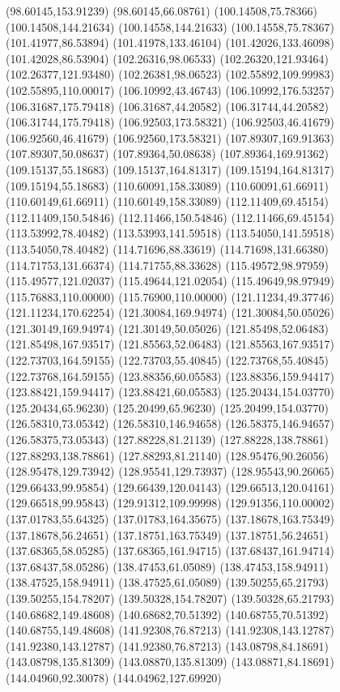 {(98.60145,153.91239) (98.60145,66.08761) (100.14508,75.78366) (100.14508,144.21634) (100.14558,144.21633) (100.14558,75.78367) (101.41977,86.53894) (101.41978,133.46104)
(101.42026,133.46098) (101.42028,86.53904) (102.26316,98.06533) (102.26320,121.93464) (102.26377,121.93480) (102.26381,98.06523) (102.55892,109.99983) (102.55895,110.00017)
(106.10992,43.46743) (106.10992,176.53257) (106.31687,175.79418) (106.31687,44.20582) (106.31744,44.20582) (106.31744,175.79418) (106.92503,173.58321) (106.92503,46.41679)
(106.92560,46.41679) (106.92560,173.58321) (107.89307,169.91363) (107.89307,50.08637) (107.89364,50.08638) (107.89364,169.91362) (109.15137,55.18683) (109.15137,164.81317)
(109.15194,164.81317) (109.15194,55.18683) (110.60091,158.33089) (110.60091,61.66911) (110.60149,61.66911) (110.60149,158.33089) (112.11409,69.45154) (112.11409,150.54846)
(112.11466,150.54846) (112.11466,69.45154) (113.53992,78.40482) (113.53993,141.59518) (113.54050,141.59518) (113.54050,78.40482) (114.71696,88.33619) (114.71698,131.66380)
(114.71753,131.66374) (114.71755,88.33628) (115.49572,98.97959) (115.49577,121.02037) (115.49644,121.02054) (115.49649,98.97949) (115.76883,110.00000) (115.76900,110.00000)
(121.11234,49.37746) (121.11234,170.62254) (121.30084,169.94974) (121.30084,50.05026) (121.30149,169.94974) (121.30149,50.05026) (121.85498,52.06483) (121.85498,167.93517)
(121.85563,52.06483) (121.85563,167.93517) (122.73703,164.59155) (122.73703,55.40845) (122.73768,55.40845) (122.73768,164.59155) (123.88356,60.05583) (123.88356,159.94417)
(123.88421,159.94417) (123.88421,60.05583) (125.20434,154.03770) (125.20434,65.96230) (125.20499,65.96230) (125.20499,154.03770) (126.58310,73.05342) (126.58310,146.94658)
(126.58375,146.94657) (126.58375,73.05343) (127.88228,81.21139) (127.88228,138.78861) (127.88293,138.78861) (127.88293,81.21140) (128.95476,90.26056) (128.95478,129.73942)
(128.95541,129.73937) (128.95543,90.26065) (129.66433,99.95854) (129.66439,120.04143) (129.66513,120.04161) (129.66518,99.95843) (129.91312,109.99998) (129.91356,110.00002)
(137.01783,55.64325) (137.01783,164.35675) (137.18678,163.75349) (137.18678,56.24651) (137.18751,163.75349) (137.18751,56.24651) (137.68365,58.05285) (137.68365,161.94715)
(137.68437,161.94714) (137.68437,58.05286) (138.47453,61.05089) (138.47453,158.94911) (138.47525,158.94911) (138.47525,61.05089) (139.50255,65.21793) (139.50255,154.78207)
(139.50328,154.78207) (139.50328,65.21793) (140.68682,149.48608) (140.68682,70.51392) (140.68755,70.51392) (140.68755,149.48608) (141.92308,76.87213) (141.92308,143.12787)
(141.92380,143.12787) (141.92380,76.87213) (143.08798,84.18691) (143.08798,135.81309) (143.08870,135.81309) (143.08871,84.18691) (144.04960,92.30078) (144.04962,127.69920)
}

